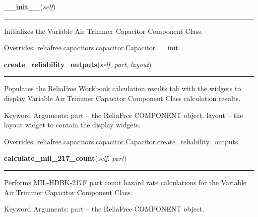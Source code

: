\hspace{.8\funcindent}\begin{boxedminipage}{\funcwidth}

    \raggedright \textbf{\_\_init\_\_}(\textit{self})

    \vspace{-1.5ex}

    \rule{\textwidth}{0.5\fboxrule}
\setlength{\parskip}{2ex}
    Initializes the Variable Air Trimmer Capacitor Component Class.

\setlength{\parskip}{1ex}
      Overrides: reliafree.capacitors.capacitor.Capacitor.\_\_init\_\_

    \end{boxedminipage}

    \vspace{0.5ex}

\hspace{.8\funcindent}\begin{boxedminipage}{\funcwidth}

    \raggedright \textbf{create\_reliability\_outputs}(\textit{self}, \textit{part}, \textit{layout})

    \vspace{-1.5ex}

    \rule{\textwidth}{0.5\fboxrule}
\setlength{\parskip}{2ex}
    Populates the ReliaFree Workbook calculation results tab with the 
    widgets to display Variable Air Trimmer Capacitor Component Class 
    calculation results.

    Keyword Arguments: part   -- the ReliaFree COMPONENT object. layout -- 
    the layout widget to contain the display widgets.

\setlength{\parskip}{1ex}
      Overrides: reliafree.capacitors.capacitor.Capacitor.create\_reliability\_outputs

    \end{boxedminipage}

    \label{reliafree:capacitors:variable:AirTrimmer:calculate_mil_217_count}

    \vspace{0.5ex}

\hspace{.8\funcindent}\begin{boxedminipage}{\funcwidth}

    \raggedright \textbf{calculate\_mil\_217\_count}(\textit{self}, \textit{part})

    \vspace{-1.5ex}

    \rule{\textwidth}{0.5\fboxrule}
\setlength{\parskip}{2ex}
    Performs MIL-HDBK-217F part count hazard rate calculations for the 
    Variable Air Trimmer Capacitor Component Class.

    Keyword Arguments: part -- the ReliaFree COMPONENT object.

\setlength{\parskip}{1ex}
    \end{boxedminipage}


